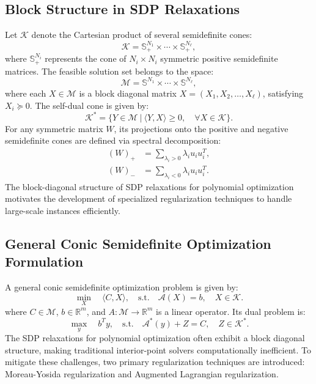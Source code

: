 \documentclass[12pt]{l4dc2021}
\begin{document}
    \subsection{Block Structure in SDP Relaxations}
        Let \( \mathcal{K} \) denote the Cartesian product of several semidefinite cones:
        \begin{equation}
            \mathcal{K} = \mathbb{S}^{N_1}_+ \times \cdots \times \mathbb{S}^{N_\ell}_+,
        \end{equation}
        where \( \mathbb{S}^{N_i}_+ \) represents the cone of \( N_i \times N_i \) symmetric positive semidefinite matrices. The feasible solution set belongs to the space:
        \begin{equation}
            \mathcal{M} = \mathbb{S}^{N_1} \times \cdots \times \mathbb{S}^{N_\ell},
        \end{equation}
        where each \( X \in \mathcal{M} \) is a block diagonal matrix \( X = (X_1, X_2, \dots, X_\ell) \), satisfying \( X_i \succeq 0 \). The self-dual cone is given by:
        \begin{equation}
            \mathcal{K}^* = \{ Y \in \mathcal{M} \ | \ \langle Y, X \rangle \geq 0, \quad \forall X \in \mathcal{K} \}.
        \end{equation}
        For any symmetric matrix \( W \), its projections onto the positive and negative semidefinite cones are defined via spectral decomposition:
        \begin{align}
            (W)_+ &= \sum_{\lambda_i > 0} \lambda_i u_i u_i^T, \\
            (W)_- &= \sum_{\lambda_i < 0} \lambda_i u_i u_i^T.
        \end{align}
        The block-diagonal structure of SDP relaxations for polynomial optimization motivates the development of specialized regularization techniques to handle large-scale instances efficiently.
    \subsection{General Conic Semidefinite Optimization Formulation}
        A general conic semidefinite optimization problem is given by:
        \begin{equation}
            \min_{X} \quad \langle C,X \rangle, \quad \text{s.t.} \quad \mathcal{A}(X) = b, \quad X \in \mathcal{K}.
        \end{equation}
        where \( C \in \mathcal{M} \), \( b \in \mathbb{R}^m \), and \( A: \mathcal{M} \to \mathbb{R}^m \) is a linear operator.
        Its dual problem is:
        \begin{equation}
            \max_{y} \quad b^T y, \quad \text{s.t.} \quad \mathcal{A}^*(y) + Z = C, \quad Z \in \mathcal{K}^*.
        \end{equation}
        The SDP relaxations for polynomial optimization often exhibit a block diagonal structure, making traditional interior-point solvers computationally inefficient. To mitigate these challenges, two primary regularization techniques are introduced: Moreau-Yosida regularization and Augmented Lagrangian regularization.
    
\end{document}
